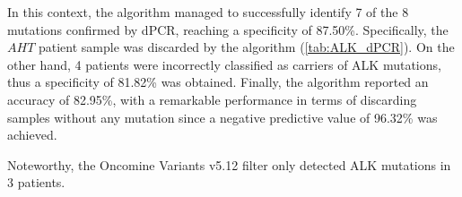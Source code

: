 \begin{table}[ht]
\centering
{}
\caption{Performance of the algorithm developed to filter the ALK mutations obtained from NGS. The results obtained by dPCR were taken as the gold standard.}
\label{tab:ALG_performance}
\end{table}

In this context, the algorithm managed to successfully identify 7 of the 8 mutations confirmed by dPCR, reaching a specificity of 87.50\%. Specifically, the $AHT$ patient sample was discarded by the algorithm (\autoref{tab:ALK_dPCR}). On the other hand, 4 patients were incorrectly classified as carriers of ALK mutations, thus a specificity of 81.82\% was obtained. Finally, the algorithm reported an accuracy of 82.95\%, with a remarkable performance in terms of discarding samples without any mutation since a negative predictive value of 96.32\% was achieved.

Noteworthy, the Oncomine\texttrademark{} Variants v5.12 filter only detected ALK mutations in 3 patients.










